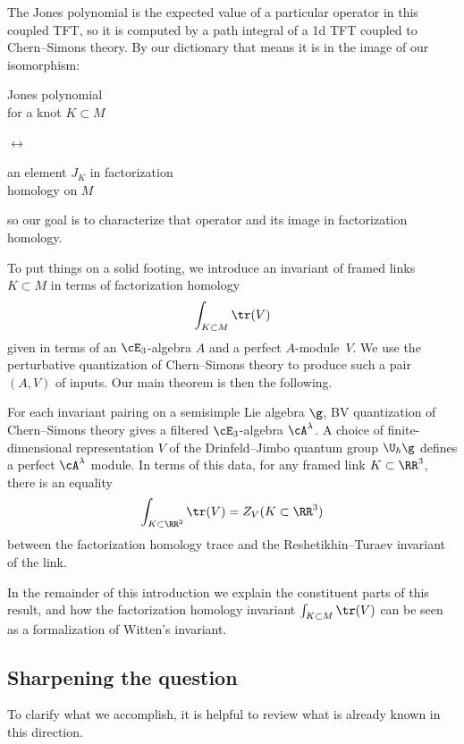 \documentclass[10pt]{amsart}
\begin{document}
The Jones polynomial is the expected value of a particular operator in this coupled TFT,
so it is computed by a path integral of a 1d TFT coupled to Chern--Simons theory. 
By our dictionary that means it is in the image of our isomorphism:  
\begin{center}
\begin{minipage}{.25\textwidth}
{\selectfont
Jones polynomial\\ for a knot $K \subset M$}
\end{minipage}
$\longleftrightarrow\quad$ 
\begin{minipage}{.4\textwidth}
{\selectfont an element $J_K$ in factorization \\homology on $M$}
\end{minipage}
\end{center}
so our goal is to characterize that operator and its image in factorization homology.

To put things on a solid footing, 
we introduce an invariant of framed links $K\subset M$ in terms of factorization homology
\[
\int_{K\subset M} \tr(V)
\]
given in terms of an $\cE_3$-algebra $A$ and a perfect $A$-module~$V$.
We use the perturbative quantization of Chern--Simons theory to produce such a pair $(A,V)$ of inputs.
Our main theorem is then the following.

\begin{thm}
\label{thm: central}
For each invariant pairing on a semisimple Lie algebra $\g$, 
BV quantization of Chern--Simons theory gives a filtered $\cE_3$-algebra $\cA^\lambda$. 
A choice of finite-dimensional representation $V$ of the Drinfeld--Jimbo quantum group $\U_\hbar\g$ defines a perfect $\cA^\lambda$ module.
In terms of this data, 
for any framed link $K\subset \RR^3$, there is an equality
\[
\int_{K\subset\RR^3}\tr(V) = Z_V(K\subset \RR^3)
\]
between the factorization homology trace and the Reshetikhin--Turaev invariant of the link.
\end{thm}

In the remainder of this introduction we explain the constituent parts of this result, 
and how the factorization homology invariant $\int_{K\subset M} \tr(V)$ can be seen as a formalization of Witten's invariant.

\subsection{Sharpening the question}

To clarify what we accomplish, 
it is helpful to review what is already known in this direction.
\end{document}
